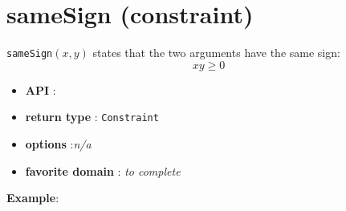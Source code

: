 \label{samesign}
\hypertarget{samesign}{}

\section{sameSign (constraint)}\label{samesign:samesignconstraint}\hypertarget{samesign:samesignconstraint}{}

\begin{notedef}
  \texttt{sameSign}$(x,y)$ states that the two arguments have the same sign:
$$xy\ge 0$$
\end{notedef}

\begin{itemize}
	\item \textbf{API} : 
	\item \textbf{return type} : \texttt{Constraint}
	\item \textbf{options} :\emph{n/a}
	\item \textbf{favorite domain} : \emph{to complete}
\end{itemize}

\textbf{Example}:

